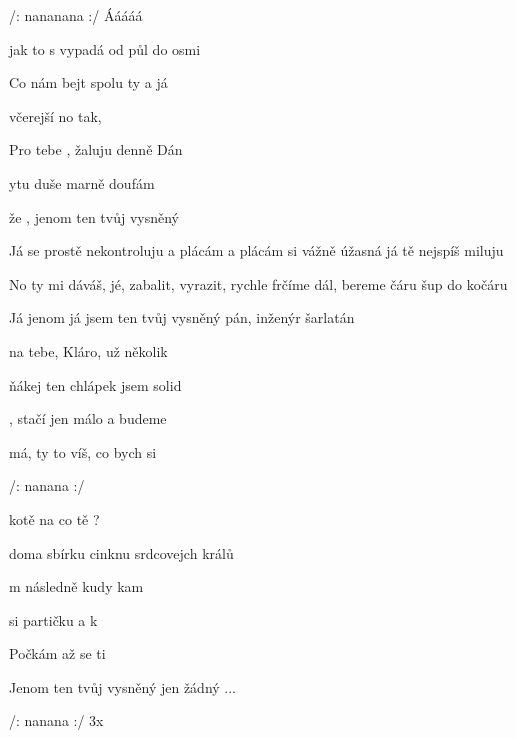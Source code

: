 

/:  nananana   :/ Ááááá

\zs
{} jak to s  vypadá od půl  do osmi 

Co nám  bejt spolu  ty a já

 včerejší no tak, 

Pro tebe , žaluju denně  Dán

ytu duše marně  doufám

že , jenom  ten tvůj vysněný  
\ks

\zs
Já se prostě nekontroluju a plácám a plácám
si vážně úžasná já tě nejspíš miluju

No ty mi dáváš, jé,
zabalit, vyrazit, rychle frčíme dál,
bereme čáru šup do kočáru

Já jenom já jsem ten tvůj vysněný pán,
inženýr šarlatán
\ks

\zr
{} na tebe, Kláro, už několik  

 ňákej ten chlápek jsem solid 

, stačí jen málo a budeme  

 má, ty to víš, co bych si  
\kr


/:  nanana   :/


\zs
{} kotě na co tě ?

 doma sbírku cinknu srdcovejch králů

m následně  kudy kam

 si partičku a  k 

Počkám až    se ti 

Jenom  ten tvůj vysněný 
jen žádný ...
\ks

\zr  \kr

/:  nanana   :/ 3x

\kp





